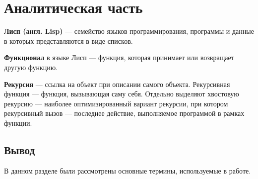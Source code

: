 \chapter{Аналитическая часть}

\textbf{Лисп (англ. Lisp)} --- семейство языков программирования, программы и данные в которых представляются в виде списков.

\textbf{Функционал} в языке Лисп --- функция, которая принимает или возвращает другую функцию. 

\textbf{Рекурсия} --- ссылка на объект при описании самого объекта. Рекурсивная функция --- функция, вызывающая саму себя. Отдельно выделяют хвостовую рекурсию --- наиболее оптимизированный вариант рекурсии, при котором рекурсивный вызов --- последнее действие, выполняемое программой в рамках функции.

\section*{Вывод}
В данном разделе были рассмотрены основные термины, используемые в работе. 